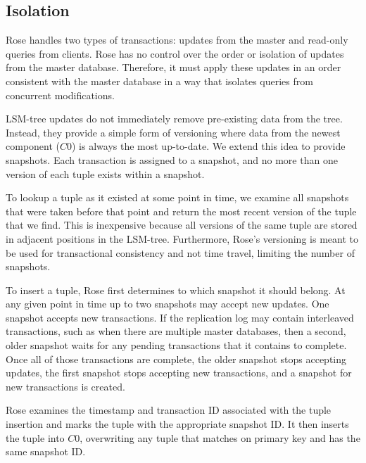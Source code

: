\documentclass{vldb}
\newcommand{\rows}{Rose\xspace}
\newcommand{\rowss}{Rose's\xspace}
\begin{document}



\subsection{Isolation}
\label{sec:isolation}

\rows handles two types of transactions: updates from the
master and read-only queries from clients.  \rows has no control over the order or
isolation of updates from the master database.  Therefore, it must
apply these updates in an order consistent with the master database
in a way that isolates queries from concurrent modifications.

LSM-tree updates do not immediately remove pre-existing data
from the tree.  Instead, they provide a simple form of versioning
where data from the newest component ($C0$) is always the most up-to-date.
We extend this idea to provide snapshots.  Each transaction is
assigned to a snapshot, and no more than one version of each tuple
exists within a snapshot.

To lookup a tuple as it existed at some point in time, we examine all
snapshots that were taken before that point and return the most recent
version of the tuple that we find.  This is inexpensive because all versions of the same tuple are
stored in adjacent positions in the LSM-tree.  Furthermore, \rowss versioning is meant to be
used for transactional consistency and not time travel, limiting
the number of snapshots.

To insert a tuple, \rows first determines to which snapshot it
should belong.  At any given point in time up to two snapshots
may accept new updates.  One snapshot accepts new
transactions.  If the replication log may contain interleaved transactions,
such as when there are multiple master databases, then
a second, older snapshot waits for any pending transactions that
it contains to complete.  Once all of those transactions are complete,
the older snapshot stops accepting updates, the first snapshot
stops accepting new transactions, and a snapshot for new
transactions is created.

\rows examines the timestamp and transaction ID associated with the tuple insertion
and marks the tuple with the appropriate snapshot ID.  It then
inserts the tuple into $C0$, overwriting any tuple that matches on
primary key and has the same snapshot ID.
\end{document}
